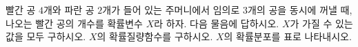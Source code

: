빨간 공 $4$개와 파란 공 $2$개가 들어 있는 주머니에서 임의로 $3$개의 공을 동시에 꺼낼 때, 나오는 빨간 공의 개수를 확률변수 $X$라 하자. 다음 물음에 답하시오.
 $X$가 가질 수 있는 값을 모두 구하시오.
 $X$의 확률질량함수를 구하시오.
 $X$의 확률분포를 표로 나타내시오.
